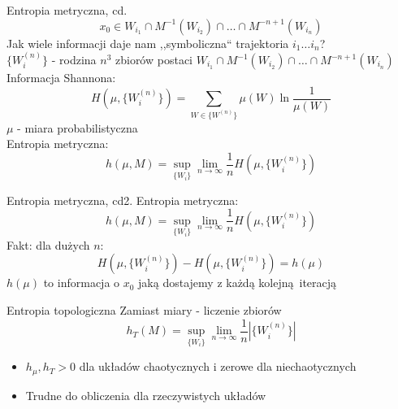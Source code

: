 \documentclass{beamer}
\begin{document}
\begin{frame}{Entropia metryczna, cd.}
	\begin{equation*}
		x_0 \in W_{i_1} \cap M^{-1}(W_{i_2}) \cap \dots \cap M^{-n+1}(W_{i_n})
	\end{equation*}
	Jak wiele informacji daje nam ,,symboliczna`` trajektoria $i_1 \dots i_n$?\\ \pause
	$\{W^{(n)}_i\}$ - rodzina $n^3$ zbiorów postaci
	$W_{i_1} \cap M^{-1}(W_{i_2}) \cap \dots \cap M^{-n+1}(W_{i_n})$ \pause \\
	Informacja Shannona:
	\begin{equation*}
		H(\mu, \{W^{(n)}_i\})=\sum_{W \in \{W^{(n)}\}}\mu(W)\ln\frac{1}{\mu(W)}
	\end{equation*}
	$\mu$ - miara probabilistyczna\\ \pause
	Entropia metryczna:
	\begin{equation*}
		h(\mu, M) = \sup_{\{W_i\}}\lim_{n\to\infty}\frac{1}{n}H(\mu, \{W_i^{(n)}\})
	\end{equation*}
\end{frame}

\begin{frame}{Entropia metryczna, cd2.}
	Entropia metryczna:
	\begin{equation*}
		h(\mu, M) = \sup_{\{W_i\}}\lim_{n\to\infty}\frac{1}{n}H(\mu, \{W_i^{(n)}\})
	\end{equation*}
	Fakt: dla dużych $n$: 
	\begin{equation*}
		H(\mu, \{W^{(n)}_i\}) - H(\mu, \{W^{(n)}_i\}) = h(\mu)
	\end{equation*}
 $h(\mu)$ to informacja o $x_0$ jaką dostajemy z każdą kolejną iteracją
\end{frame}

\begin{frame}{Entropia topologiczna}
	Zamiast miary - liczenie zbiorów
	\begin{equation*}
		h_T(M) = \sup_{\{W_i\}}\lim_{n\to\infty}\frac{1}{n}|\{W_i^{(n)}\}|
	\end{equation*}
	\begin{itemize}
		\item $h_\mu, h_T > 0 $ dla układów chaotycznych i zerowe dla niechaotycznych
		\item Trudne do obliczenia dla rzeczywistych układów
	\end{itemize} 
\end{frame}
\end{document}
